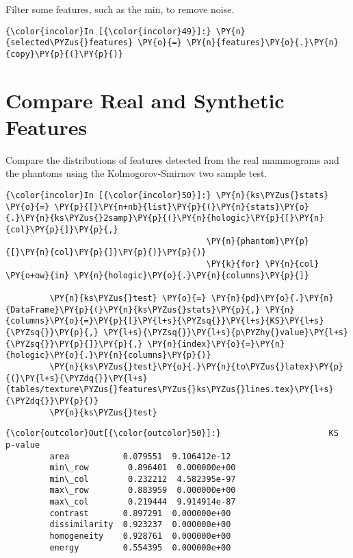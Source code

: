     Filter some features, such as the min, to remove noise.

    \begin{Verbatim}[commandchars=\\\{\}]
{\color{incolor}In [{\color{incolor}49}]:} \PY{n}{selected\PYZus{}features} \PY{o}{=} \PY{n}{features}\PY{o}{.}\PY{n}{copy}\PY{p}{(}\PY{p}{)}
\end{Verbatim}

    \section{Compare Real and Synthetic
Features}\label{compare-real-and-synthetic-features}

    Compare the distributions of features detected from the real mammograms
and the phantoms using the Kolmogorov-Smirnov two sample test.

    \begin{Verbatim}[commandchars=\\\{\}]
{\color{incolor}In [{\color{incolor}50}]:} \PY{n}{ks\PYZus{}stats} \PY{o}{=} \PY{p}{[}\PY{n+nb}{list}\PY{p}{(}\PY{n}{stats}\PY{o}{.}\PY{n}{ks\PYZus{}2samp}\PY{p}{(}\PY{n}{hologic}\PY{p}{[}\PY{n}{col}\PY{p}{]}\PY{p}{,}
                                         \PY{n}{phantom}\PY{p}{[}\PY{n}{col}\PY{p}{]}\PY{p}{)}\PY{p}{)}
                                         \PY{k}{for} \PY{n}{col} \PY{o+ow}{in} \PY{n}{hologic}\PY{o}{.}\PY{n}{columns}\PY{p}{]}

         \PY{n}{ks\PYZus{}test} \PY{o}{=} \PY{n}{pd}\PY{o}{.}\PY{n}{DataFrame}\PY{p}{(}\PY{n}{ks\PYZus{}stats}\PY{p}{,} \PY{n}{columns}\PY{o}{=}\PY{p}{[}\PY{l+s}{\PYZsq{}}\PY{l+s}{KS}\PY{l+s}{\PYZsq{}}\PY{p}{,} \PY{l+s}{\PYZsq{}}\PY{l+s}{p\PYZhy{}value}\PY{l+s}{\PYZsq{}}\PY{p}{]}\PY{p}{,} \PY{n}{index}\PY{o}{=}\PY{n}{hologic}\PY{o}{.}\PY{n}{columns}\PY{p}{)}
         \PY{n}{ks\PYZus{}test}\PY{o}{.}\PY{n}{to\PYZus{}latex}\PY{p}{(}\PY{l+s}{\PYZdq{}}\PY{l+s}{tables/texture\PYZus{}features\PYZus{}ks\PYZus{}lines.tex}\PY{l+s}{\PYZdq{}}\PY{p}{)}
         \PY{n}{ks\PYZus{}test}
\end{Verbatim}

            \begin{Verbatim}[commandchars=\\\{\}]
{\color{outcolor}Out[{\color{outcolor}50}]:}                      KS       p-value
         area           0.079551  9.106412e-12
         min\_row        0.896401  0.000000e+00
         min\_col        0.232212  4.582395e-97
         max\_row        0.883959  0.000000e+00
         max\_col        0.219444  9.914914e-87
         contrast       0.897291  0.000000e+00
         dissimilarity  0.923237  0.000000e+00
         homogeneity    0.928761  0.000000e+00
         energy         0.554395  0.000000e+00
\end{Verbatim}

